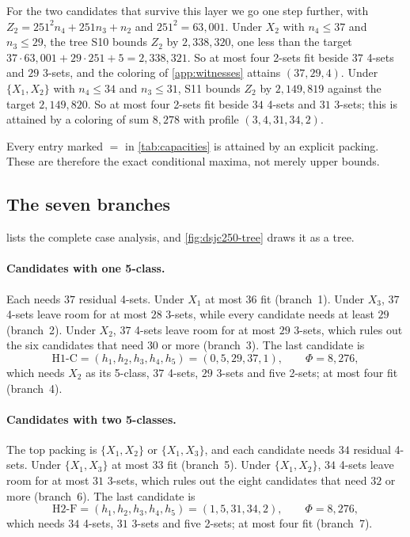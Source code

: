 \documentclass[11pt]{article}
\theoremstyle{definition}
\begin{document}
For the two candidates that survive this layer we go one step further, with
$Z_2=251^2n_4+251n_3+n_2$ and $251^2=63{,}001$. Under $X_2$ with $n_4\le37$
and $n_3\le29$, the tree S10 bounds $Z_2$ by $2{,}338{,}320$, one less than
the target $37\cdot63{,}001+29\cdot251+5=2{,}338{,}321$. So at most four
2-sets fit beside $37$ 4-sets and $29$ 3-sets, and the coloring of
\cref{app:witnesses} attains $(37,29,4)$. Under $\{X_1,X_2\}$ with
$n_4\le34$ and $n_3\le31$, S11 bounds $Z_2$ by $2{,}149{,}819$ against the
target $2{,}149{,}820$. So at most four 2-sets fit beside $34$ 4-sets and
$31$ 3-sets; this is attained by a coloring of sum $8{,}278$ with profile
$(3,4,31,34,2)$.

Every entry marked $=$ in \cref{tab:capacities} is attained by an explicit
packing. These are therefore the exact conditional maxima, not merely upper
bounds.

\subsection{The seven branches}
\label{sec:branches}

 lists the complete case analysis, and
\cref{fig:dsjc250-tree} draws it as a tree.

\paragraph{Candidates with one 5-class.} Each needs $37$ residual 4-sets.
Under $X_1$ at most $36$ fit (branch~1). Under $X_3$, $37$ 4-sets leave room
for at most $28$ 3-sets, while every candidate needs at least $29$
(branch~2). Under $X_2$, $37$ 4-sets leave room for at most $29$ 3-sets,
which rules out the six candidates that need $30$ or more (branch~3). The
last candidate is
\begin{equation}
\label{eq:H1C}
  \mathrm{H1\mbox{-}C}=(h_1,h_2,h_3,h_4,h_5)=(0,5,29,37,1),\qquad\Phi=8{,}276,
\end{equation}
which needs $X_2$ as its 5-class, $37$ 4-sets, $29$ 3-sets and five 2-sets;
at most four fit (branch~4).

\paragraph{Candidates with two 5-classes.} The top packing is
$\{X_1,X_2\}$ or $\{X_1,X_3\}$, and each candidate needs $34$ residual
4-sets. Under $\{X_1,X_3\}$ at most $33$ fit (branch~5). Under
$\{X_1,X_2\}$, $34$ 4-sets leave room for at most $31$ 3-sets, which rules
out the eight candidates that need $32$ or more (branch~6). The last
candidate is
\begin{equation}
\label{eq:H2F}
  \mathrm{H2\mbox{-}F}=(h_1,h_2,h_3,h_4,h_5)=(1,5,31,34,2),\qquad\Phi=8{,}276,
\end{equation}
which needs $34$ 4-sets, $31$ 3-sets and five 2-sets; at most four fit
(branch~7).
\end{document}
